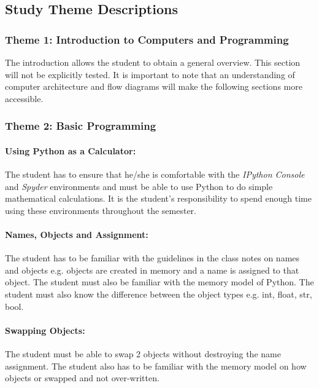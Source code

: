     \subsection{Study Theme Descriptions}
        \subsubsection{Theme 1: Introduction to Computers and Programming}
            The introduction allows the student to obtain a general overview.
            This section will not be explicitly tested. It is important to note
            that an understanding of computer architecture and flow diagrams
            will make the following sections more accessible.

        \subsubsection{Theme 2: Basic Programming}
            \paragraph{Using Python as a Calculator:}
                The student has to ensure that he/she is comfortable with the
                \emph{IPython Console} and \emph{Spyder} environments and must
                be able to use Python to do simple mathematical calculations.
                It is the student's responsibility to spend enough time using
                these environments throughout the semester.

            \paragraph{Names, Objects and Assignment:}
                The student has to be familiar with the guidelines in the class
                notes on names and objects e.g. objects are created in memory
                and a name is assigned to that object. The student must also
                be familiar with the memory model of Python. The student must
                also know the difference between the object types e.g. int,
                float, str, bool.

            \paragraph{Swapping Objects:}
                The student must be able to swap 2 objects without destroying
                the name assignment. The student also has to be familiar with
                the memory model on how objects or swapped and not over-written.

